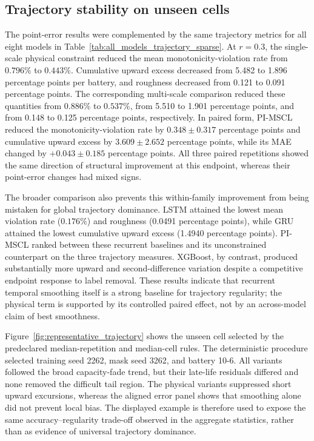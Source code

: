 \documentclass[pdflatex,sn-mathphys-num]{sn-jnl}
\begin{document}


\subsection{Trajectory stability on unseen cells}
\label{subsec:new_trajectory_results}

The point-error results were complemented by the same trajectory metrics for all eight models in Table~\ref{tab:all_models_trajectory_sparse}. At $r=0.3$, the single-scale physical constraint reduced the mean monotonicity-violation rate from $0.796\%$ to $0.443\%$. Cumulative upward excess decreased from 5.482 to 1.896 percentage points per battery, and roughness decreased from 0.121 to 0.091 percentage points. The corresponding multi-scale comparison reduced these quantities from $0.886\%$ to $0.537\%$, from 5.510 to 1.901 percentage points, and from 0.148 to 0.125 percentage points, respectively. In paired form, PI-MSCL reduced the monotonicity-violation rate by $0.348\pm0.317$ percentage points and cumulative upward excess by $3.609\pm2.652$ percentage points, while its MAE changed by $+0.043\pm0.185$ percentage points. All three paired repetitions showed the same direction of structural improvement at this endpoint, whereas their point-error changes had mixed signs.



The broader comparison also prevents this within-family improvement from being mistaken for global trajectory dominance. LSTM attained the lowest mean violation rate ($0.176\%$) and roughness (0.0491 percentage points), while GRU attained the lowest cumulative upward excess (1.4940 percentage points). PI-MSCL ranked between these recurrent baselines and its unconstrained counterpart on the three trajectory measures. XGBoost, by contrast, produced substantially more upward and second-difference variation despite a competitive endpoint response to label removal. These results indicate that recurrent temporal smoothing itself is a strong baseline for trajectory regularity; the physical term is supported by its controlled paired effect, not by an across-model claim of best smoothness.

Figure~\ref{fig:representative_trajectory} shows the unseen cell selected by the predeclared median-repetition and median-cell rules. The deterministic procedure selected training seed 2262, mask seed 3262, and battery 10-6. All variants followed the broad capacity-fade trend, but their late-life residuals differed and none removed the difficult tail region. The physical variants suppressed short upward excursions, whereas the aligned error panel shows that smoothing alone did not prevent local bias. The displayed example is therefore used to expose the same accuracy--regularity trade-off observed in the aggregate statistics, rather than as evidence of universal trajectory dominance.
\end{document}
